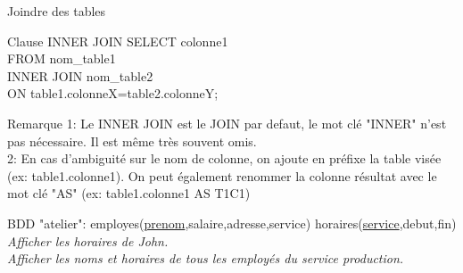 \documentclass[xetex,dvipsnames]{beamer}
\begin{document}
\begin{frame}[t]{Joindre des tables}

	\begin{alertblock}{Clause INNER JOIN}
		SELECT colonne1 \\FROM nom\_table1 \\INNER JOIN nom\_table2 \\ON table1.colonneX=table2.colonneY;
	\end{alertblock}
\begin{footnotesize}
	\begin{block}{Remarque}
	 1: Le INNER JOIN est le JOIN par defaut, le mot clé "INNER" n'est pas nécessaire. Il est même très souvent omis.
	\\2: En cas d'ambiguité sur le nom de colonne, on ajoute en préfixe la table visée (ex: table1.colonne1). On peut également renommer la colonne résultat avec le mot clé "AS" (ex: table1.colonne1 AS T1C1)
	\end{block}
\end{footnotesize}
		
\begin{scriptsize}
		\vspace{1em}
		BDD "atelier": employes(\underline{prenom},salaire,adresse,service) horaires(\underline{service},debut,fin)\\
		\vspace{0.5em}
		\textit{Afficher les horaires de John.}\\
		\textit{Afficher les noms et horaires de tous les employés du service production.}\\
\end{scriptsize}
\end{frame}
\end{document}
